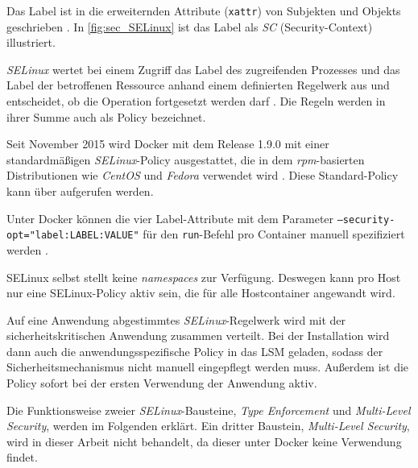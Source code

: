 \documentclass[../main.tex]{subfiles}
\begin{document}
				Das Label ist in die erweiternden Attribute (\texttt{xattr}) von Subjekten und Objekts geschrieben \cite[S.65]{linuxMagazineSec}. In \fig \ref{fig:sec_SELinux} ist das Label als \emph{SC} (Security-Context) illustriert.


				\emph{SELinux} wertet bei einem Zugriff das Label des zugreifenden Prozesses und das Label der betroffenen Ressource anhand einem definierten Regelwerk aus und entscheidet, ob die Operation fortgesetzt werden darf \cite{linuxSecOverview}. Die Regeln werden in ihrer Summe auch als Policy bezeichnet.

				Seit November 2015 wird Docker mit dem Release 1.9.0 mit einer standardmäßigen \emph{SELinux}-Policy ausgestattet, die in dem \emph{rpm}-basierten Distributionen wie \emph{CentOS} und \emph{Fedora} verwendet wird \cite{githubDockerChangelog}\cite{githubSELinuxPolicyIssue}. Diese Standard-Policy kann über \cite{githubSELinuxProfile} aufgerufen werden.

				Unter Docker können die vier Label-Attribute mit dem Parameter \texttt{--security-opt="label:LABEL:VALUE"} für den \texttt{run}-Befehl pro Container manuell spezifiziert werden \cite{dockerRun}.


				SELinux selbst stellt keine \emph{namespaces} zur Verfügung. Deswegen kann pro Host nur eine SELinux-Policy aktiv sein, die für alle Hostcontainer angewandt wird.

				Auf eine Anwendung abgestimmtes \emph{SELinux}-Regelwerk wird mit der sicherheitskritischen Anwendung zusammen verteilt. Bei der Installation wird dann auch die anwendungsspezifische Policy in das LSM geladen, sodass der Sicherheitsmechanismus nicht manuell eingepflegt werden muss. Außerdem ist die Policy sofort bei der ersten Verwendung der Anwendung aktiv.

				Die Funktionsweise zweier \emph{SELinux}-Bausteine, \emph{Type Enforcement} und \emph{Multi-Level Security}, werden im Folgenden erklärt. Ein dritter Baustein, \emph{Multi-Level Security}, wird in dieser Arbeit nicht behandelt, da dieser unter Docker keine Verwendung findet.
\end{document}
